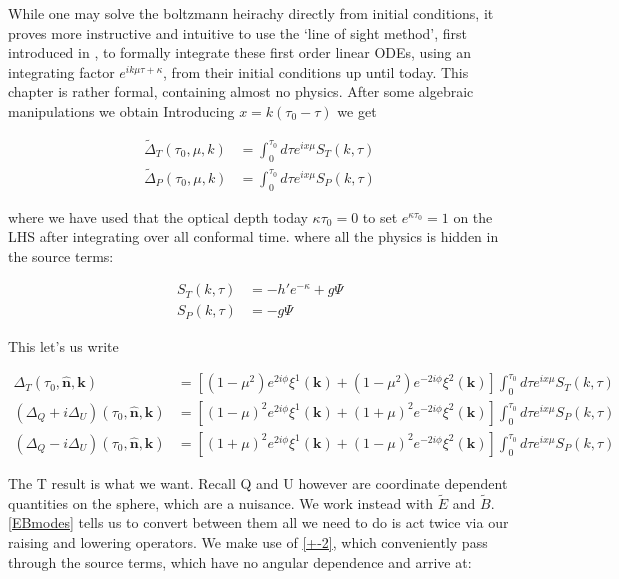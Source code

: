 \documentclass[a4paper,10pt]{article}
\renewcommand{\v}[1]{\mathbf{#1}}
\newcommand{\unit}[1]{\hat{\v{#1}}}
\begin{document}
While one may solve the boltzmann heirachy directly from initial conditions, it proves more instructive and intuitive to use the `line of sight method', first introduced in \citep{LoS}, to formally integrate these first order linear ODEs, using an integrating factor $e^{ik\mu\tau+\kappa}$, from their initial conditions up until today. This chapter is rather formal, containing almost no physics. After some algebraic manipulations we obtain Introducing $x=k(\tau_0-\tau)$ we get  

\begin{equation}\begin{split}
\tilde{\Delta}_T(\tau_0,\mu,k) &= \int_0^{\tau_0}d\tau e^{ix\mu}S_T(k,\tau)\\
\tilde{\Delta}_P(\tau_0,\mu,k) &= \int_0^{\tau_0}d\tau e^{ix\mu}S_P(k,\tau)
\end{split}\end{equation}

where we have used that the optical depth today $\kappa{\tau_0}=0$ to set $e^{\kappa{\tau_0}}=1$ on the LHS after integrating over all conformal time. where all the physics is hidden in the source terms:

\begin{equation}\begin{split}
S_T(k,\tau) &= -h'e^{-\kappa}+g\Psi\\
S_P(k,\tau) &= -g\Psi
\end{split}\end{equation}

This let's us write

\begin{equation}\begin{split}
\Delta_T(\tau_0,\unit{n},\v{k}) &= [(1-\mu^2) e^{2i\phi} \xi^1(\v{k})+(1-\mu^2) e^{-2i\phi} \xi^2(\v{k})]\int_0^{\tau_0}d\tau e^{ix\mu}S_T(k,\tau)\\
(\Delta_Q+i\Delta_U)(\tau_0,\unit{n},\v{k}) &=[(1-\mu)^2 e^{2i\phi} \xi^1(\v{k})+(1+\mu)^2 e^{-2i\phi} \xi^2(\v{k})]\int_0^{\tau_0}d\tau e^{ix\mu}S_P(k,\tau)\\
(\Delta_Q-i\Delta_U)(\tau_0,\unit{n},\v{k}) &=[(1+\mu)^2 e^{2i\phi} \xi^1(\v{k})+(1-\mu)^2 e^{-2i\phi} \xi^2(\v{k})]\int_0^{\tau_0}d\tau e^{ix\mu}S_P(k,\tau)
\end{split}\end{equation}

The T result is what we want. Recall Q and U however are coordinate dependent quantities on the sphere, which are a nuisance. We work instead with $\tilde{E}$ and $\tilde{B}$. \ref{EBmodes} tells us to convert between them all we need to do is act twice via our raising and lowering operators. We make use of \ref{+-2}, which conveniently pass through the source terms, which have no angular dependence and arrive at:
\end{document}
